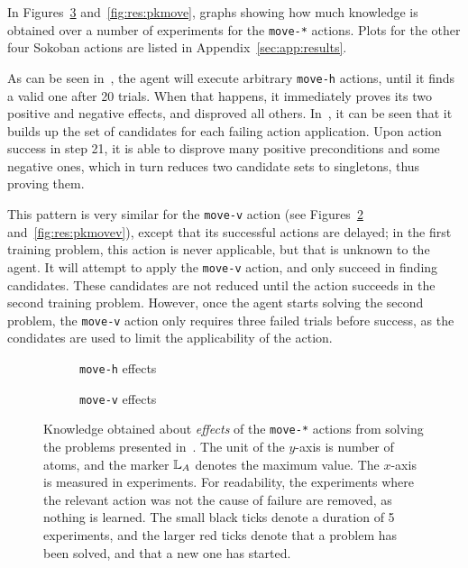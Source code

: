 \documentclass[../Master.tex]{subfiles}
\providecommand{\master}{..}
\begin{document}
In Figures~\ref{fig:res:ekmove} and~\ref{fig:res:pkmove}, graphs showing how much knowledge is obtained over a number of experiments for the \texttt{move-*} actions. Plots for the other four Sokoban actions are listed in Appendix~\ref{sec:app:results}.


As can be seen in~, the agent will execute arbitrary \texttt{move-h} actions, until it finds a valid one after 20 trials. When that happens, it immediately proves its two positive and negative effects, and disproved all others. In~, it can be seen that it builds up the set of candidates for each failing action application. Upon action success in step 21, it is able to disprove many positive preconditions and some negative ones, which in turn reduces two candidate sets to singletons, thus proving them.

This pattern is very similar for the \texttt{move-v} action (see Figures~\ref{fig:res:ekmovev} and~\ref{fig:res:pkmovev}), except that its successful actions are delayed; in the first training problem, this action is never applicable, but that is unknown to the agent. It will attempt to apply the \texttt{move-v} action, and only succeed in finding candidates. These candidates are not reduced until the action succeeds in the second training problem. However, once the agent starts solving the second problem, the \texttt{move-v} action only requires three failed trials before success, as the condidates are used to limit the applicability of the action.

\begin{figure}
    \centering
    \begin{subfigure}{0.45\linewidth}
        \resizebox{\linewidth}{!}{}
        \caption{\texttt{move-h} effects}\label{fig:res:ekmoveh}
    \end{subfigure}
    \begin{subfigure}{0.45\linewidth}
        \resizebox{\linewidth}{!}{}
        \caption{\texttt{move-v} effects}\label{fig:res:ekmovev}
    \end{subfigure}
    \caption{Knowledge obtained about \emph{effects} of the \texttt{move-*} actions from solving the problems presented in~. The unit of the $y$-axis is number of atoms, and the marker $\mathbb{L}_A$ denotes the maximum value. The $x$-axis is measured in experiments. For readability, the experiments where the relevant action was not the cause of failure are removed, as nothing is learned. The small black ticks denote a duration of 5 experiments, and the larger red ticks denote that a problem has been solved, and that a new one has started.}\label{fig:res:ekmove}
\end{figure}
\end{document}

